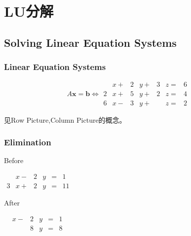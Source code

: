\chapter{LU分解}

\section{Solving Linear Equation Systems}

\subsection{Linear Equation Systems}
\begin{example}
    \begin{equation}A \boldsymbol{x}=\boldsymbol{b} \Leftrightarrow \displaystyle \begin{matrix}
              & x+ & 2 & y+ & 3 & z= & 6 \\
            2 & x+ & 5 & y+ & 2 & z= & 4 \\
            6 & x- & 3 & y+ &   & z= & 2
        \end{matrix} \end{equation}
\end{example}

见Row Picture,Column Picture的概念。

\subsection{Elimination}

\begin{example}[Elimination]
    Before

    \begin{center}
        $\displaystyle \begin{matrix}
                  & x- & 2 & y & = & 1  \\
                3 & x+ & 2 & y & = & 11
            \end{matrix}$
    \end{center}

    After
    \begin{center}
        $\displaystyle \begin{matrix}
                 & x- & 2 & y & = & 1 \\
                 &    & 8 & y & = & 8
            \end{matrix}$
    \end{center}

\end{example}

